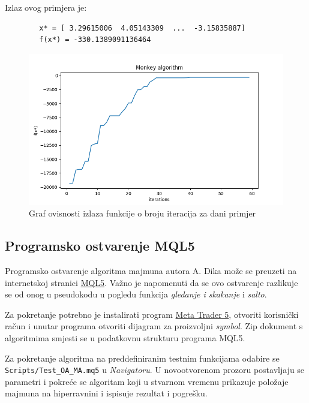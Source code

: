 \noindent Izlaz ovog primjera je:
\begin{framed}
	\begin{verbatim}
		x* = [ 3.29615006  4.05143309  ...  -3.15835887]
		f(x*) = -330.1389091136464
	\end{verbatim}
\end{framed}

\begin{figure}[h]
	\centering
	\includegraphics[width=14cm]{Figure_1}
	\caption{Graf ovisnosti izlaza funkcije o broju iteracija za dani primjer} 
	
\end{figure}



\subsection{Programsko ostvarenje MQL5}
\label{sec:mql5majmun}
Programsko ostvarenje algoritma majmuna autora A. Dika\cite{DIKMA} može se preuzeti na internetskoj stranici \href{https://www.mql5.com/en/articles/12212}{MQL5}. Važno je napomenuti da se ovo ostvarenje razlikuje se od onog u pseudokodu u pogledu funkcija \textit{gledanje i skakanje} i \textit{salto}.

Za pokretanje potrebno je instalirati program \href{https://www.metatrader5.com/en}{Meta Trader 5}, otvoriti korisnički račun i unutar programa otvoriti dijagram za proizvoljni \textit{symbol}. Zip dokument s algoritmima smjesti se u podatkovnu strukturu programa MQL5.


 Za pokretanje algoritma na preddefiniranim testnim funkcijama odabire se \verb|Scripts/Test_OA_MA.mq5| u \textit{Navigatoru}. U novootvorenom prozoru postavljaju se parametri i pokreće se algoritam koji u stvarnom vremenu prikazuje položaje majmuna na hiperravnini i ispisuje rezultat i pogrešku. 

